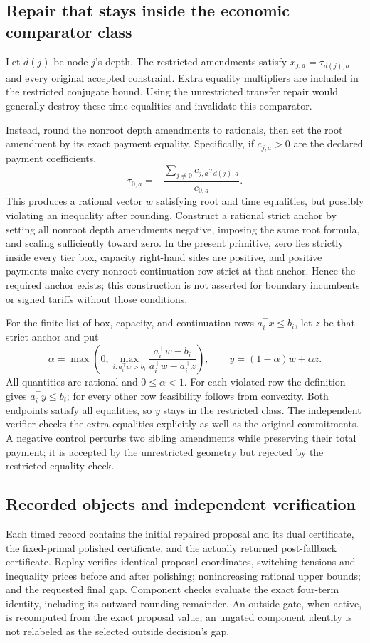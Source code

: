 \documentclass[11pt,letterpaper]{article}
\theoremstyle{definition}
\newcommand{\1}{\mathbf 1}
\begin{document}
\subsection{Repair that stays inside the economic comparator class}
Let $d(j)$ be node $j$'s depth. The restricted amendments satisfy $x_{j,a}=\tau_{d(j),a}$ and every original accepted constraint. Extra equality multipliers are included in the restricted conjugate bound. Using the unrestricted transfer repair would generally destroy these time equalities and invalidate this comparator.

Instead, round the nonroot depth amendments to rationals, then set the root amendment by its exact payment equality. Specifically, if $c_{j,a}>0$ are the declared payment coefficients,
\[
 \tau_{0,a}=-\frac{\sum_{j\ne0}c_{j,a}\tau_{d(j),a}}{c_{0,a}}.
\]
This produces a rational vector $w$ satisfying root and time equalities, but possibly violating an inequality after rounding. Construct a rational strict anchor by setting all nonroot depth amendments negative, imposing the same root formula, and scaling sufficiently toward zero. In the present primitive, zero lies strictly inside every tier box, capacity right-hand sides are positive, and positive payments make every nonroot continuation row strict at that anchor. Hence the required anchor exists; this construction is not asserted for boundary incumbents or signed tariffs without those conditions.

For the finite list of box, capacity, and continuation rows $a_i^\top x\leq b_i$, let $z$ be that strict anchor and put
\[
 \alpha=\max\left(0,\max_{i:a_i^\top w>b_i}
 \frac{a_i^\top w-b_i}{a_i^\top w-a_i^\top z}\right),\qquad
 y=(1-\alpha)w+\alpha z.
\]
All quantities are rational and $0\leq\alpha<1$. For each violated row the definition gives $a_i^\top y\leq b_i$; for every other row feasibility follows from convexity. Both endpoints satisfy all equalities, so $y$ stays in the restricted class. The independent verifier checks the extra equalities explicitly as well as the original commitments. A negative control perturbs two sibling amendments while preserving their total payment; it is accepted by the unrestricted geometry but rejected by the restricted equality check.

\subsection{Recorded objects and independent verification}
Each timed record contains the initial repaired proposal and its dual certificate, the fixed-primal polished certificate, and the actually returned post-fallback certificate. Replay verifies identical proposal coordinates, switching tensions and inequality prices before and after polishing; nonincreasing rational upper bounds; and the requested final gap. Component checks evaluate the exact four-term identity, including its outward-rounding remainder. An outside gate, when active, is recomputed from the exact proposal value; an ungated component identity is not relabeled as the selected outside decision's gap.
\end{document}
